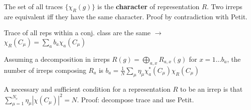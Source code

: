 \begin{squishlist}
    \item The set of all traces $\{\chi_R(g)\}$ is the \textbf{character} of representation $R$. Two irreps are equivalent iff they have the same character.
    Proof by contradiction with Petit.

    \item Trace of all reps within a conj. class are the same $\rightarrow$ $\chi_R(C_{\mu}) = \sum_a b_a \chi_a ( C_{\mu})$
    \item Assuming a decomposition in irreps $R(g) = \bigoplus_{a,x}R_{a,x}(g)$ for $x = 1 \ldots b_a$, the number of irreps composing $R_a$ is $b_a = \frac{1}{N} \sum_{\mu} \eta_{\mu} \chi^*_a(C_{\mu})\chi_R(C_{\mu})$

    \item A necessary and sufficient condition for a representation $R$ to be an irrep is that \\
    $\sum_{\mu = 1}^{N_c} \eta_{\mu} |\chi(C_{\mu})|^2 = N$. Proof: decompose trace and use Petit.
\end{squishlist}


